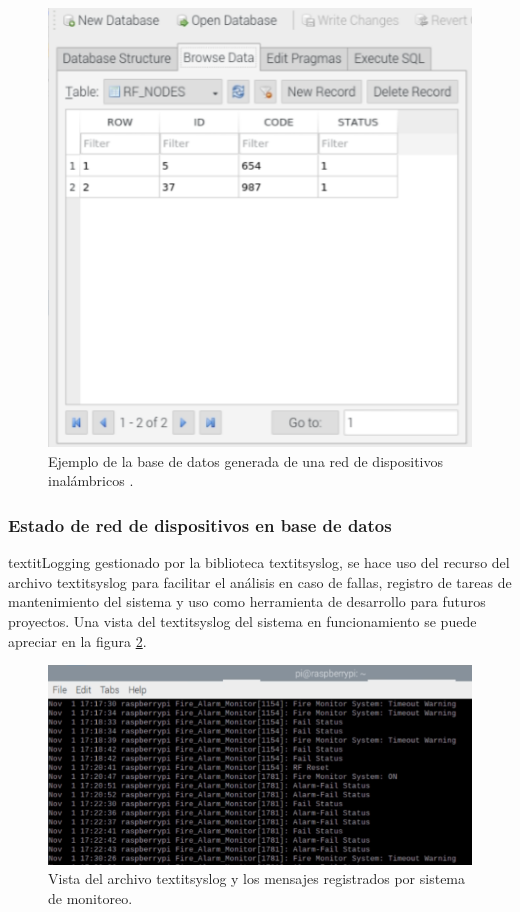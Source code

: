 \begin{figure}[ht]
	\centering
	\includegraphics[scale=.45]{./Figures/Capitulo4/Figura_O.png}
	\caption{Ejemplo de la base de datos generada de una red de dispositivos inalámbricos .}
	\label{fig:figura_o}
\end{figure}


\subsubsection{Estado de red de dispositivos en base de datos}
textit{Logging} gestionado por la biblioteca textit{syslog}, se hace uso del recurso del archivo textit{syslog} para facilitar el análisis en caso de fallas, registro de tareas de mantenimiento del sistema y uso como herramienta de desarrollo para futuros proyectos. Una vista del textit{syslog} del sistema en funcionamiento se puede apreciar en la figura \ref{fig:figura_q}.


\begin{figure}[ht]
	\centering
	\includegraphics[scale=.65]{./Figures/Capitulo4/Figura_Q.png}
	\caption{Vista del archivo textit{syslog} y los mensajes registrados por sistema de monitoreo.}
	\label{fig:figura_q}
\end{figure}

